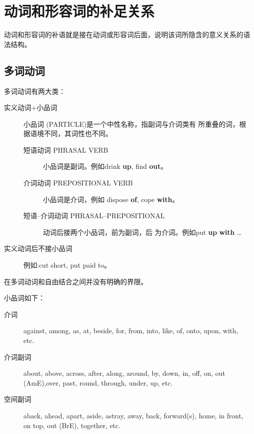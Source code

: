 
\section{动词和形容词的补足关系}

动词和形容词的补语就是接在动词或形容词后面，说明该词所隐含的意义关系的语法结构。

\subsection{多词动词}

多词动词有两大类：
\begin{description}
\item[实义动词+小品词] 小品词 (PARTICLE)是一个中性名称，指副词与介词类有
  所重叠的词，根据语境不同，其词性也不同。
  \begin{description}
  \item[短语动词 PHRASAL VERB] 小品词是副词。例如drink \textbf{up}, find
    \textbf{out}。

  \item[介词动词 PREPOSITIONAL VERB] 小品词是介词，例如 dispose \textbf{of},
    cope \textbf{with}。

  \item[短语--介词动词 PHRASAL--PREPOSITIONAL] 动词后接两个小品词，前为副词，后
    为介词。例如put
    \textbf{up} \textbf{with} \ldots{}
  \end{description}

\item[实义动词后不接小品词] 例如:cut short, put paid to。

\end{description}

在多词动词和自由结合之间并没有明确的界限。

小品词如下：
\begin{description}
\item[介词] against, among, as, at, beside, for, from, into, like, of, onto,
upon, with, etc.

\item[介词副词] about, above, across, after, along, around, by, down, in, off,
on, out (AmE),over, past, round, through, under, up, etc.

\item[空间副词] aback, ahead, apart, aside, astray, away, back, forward(s),
home, in front, on top, out (BrE), together, etc.

\end{description}

